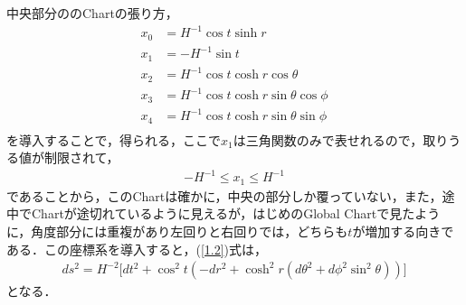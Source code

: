 中央部分ののChartの張り方，
\begin{align}
  \label{1.19}
  x_0&=H^{-1}\cos{t}\sinh{r} \\
  \label{test}
  x_1&=-H^{-1}\sin{t} \\
  x_2&=H^{-1}\cos{t}\cosh{r}\cos{\theta} \\
  x_3&=H^{-1}\cos{t}\cosh{r}\sin{\theta}\cos{\phi} \\
  x_4&=H^{-1}\cos{t}\cosh{r}\sin{\theta}\sin{\phi} \\
\end{align}
を導入することで，得られる，ここで$x_1$は三角関数のみで表せれるので，取りうる値が制限されて，
\begin{align}
  -H^{-1} \leqslant x_1 \leqslant H^{-1}
\end{align}
であることから，このChartは確かに，中央の部分しか覆っていない，また，途中でChartが途切れているように見えるが，はじめのGlobal Chartで見たように，角度部分には重複があり左回りと右回りでは，どちらも$t$が増加する向きである．この座標系を導入すると，(\ref{1.2})式は，
\begin{align}
\label{CenterM}
  ds^2=H^{-2}\biggl[dt^2+\cos^2t(-dr^2+\cosh^2r(d\theta^2+d\phi^2\sin^2\theta))\biggr]
\end{align}
となる．

